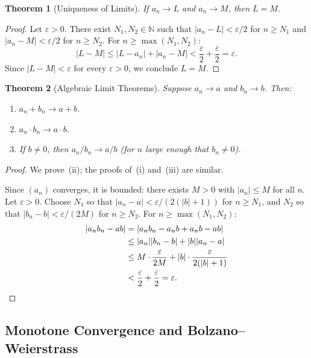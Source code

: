 \documentclass[11pt,a4paper]{article}
\theoremstyle{definition}
\theoremstyle{plain}
\newtheorem{theorem}{Theorem}[section]
\theoremstyle{remark}
\newcommand{\N}{\mathbb{N}}
\begin{document}
\begin{theorem}[Uniqueness of Limits]
\label{thm:unique_limit}
If $a_n \to L$ and $a_n \to M$, then $L = M$.
\end{theorem}

\begin{proof}
Let $\varepsilon > 0$. There exist $N_1, N_2 \in \N$ such that
$|a_n - L| < \varepsilon/2$ for $n \ge N_1$ and $|a_n - M| < \varepsilon/2$
for $n \ge N_2$. For $n \ge \max(N_1, N_2)$:
\[
|L - M| \le |L - a_n| + |a_n - M| < \frac{\varepsilon}{2} + \frac{\varepsilon}{2}
= \varepsilon.
\]
Since $|L - M| < \varepsilon$ for every $\varepsilon > 0$, we conclude $L = M$.
\end{proof}

\begin{theorem}[Algebraic Limit Theorems]
\label{thm:alg_limit}
Suppose $a_n \to a$ and $b_n \to b$. Then:
\begin{enumerate}[nosep,label=(\roman*)]
    \item $a_n + b_n \to a + b$.
    \item $a_n \cdot b_n \to a \cdot b$.
    \item If $b \neq 0$, then $a_n / b_n \to a / b$ (for $n$ large enough that
    $b_n \neq 0$).
\end{enumerate}
\end{theorem}

\begin{proof}
We prove~(ii); the proofs of~(i) and~(iii) are similar.

Since $(a_n)$ converges, it is bounded: there exists $M > 0$ with $|a_n| \le M$
for all $n$. Let $\varepsilon > 0$. Choose $N_1$ so that
$|a_n - a| < \varepsilon/(2(|b| + 1))$ for $n \ge N_1$, and $N_2$ so that
$|b_n - b| < \varepsilon/(2M)$ for $n \ge N_2$. For $n \ge \max(N_1, N_2)$:
\begin{align*}
|a_n b_n - ab|
&= |a_n b_n - a_n b + a_n b - ab| \\
&\le |a_n||b_n - b| + |b||a_n - a| \\
&\le M \cdot \frac{\varepsilon}{2M} + |b| \cdot \frac{\varepsilon}{2(|b|+1)} \\
&< \frac{\varepsilon}{2} + \frac{\varepsilon}{2} = \varepsilon. \qedhere
\end{align*}
\end{proof}

\subsection{Monotone Convergence and Bolzano--Weierstrass}
\label{subsec:monotone_bw}
\end{document}
